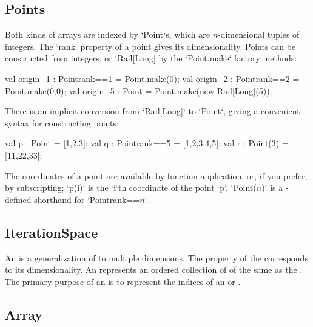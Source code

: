 \subsection{Points}\label{point-syntax}

Both kinds of arrays are indexed by \xcd`Point`s, which are
$n$-dimensional tuples of integers.  The \xcd`rank` property of a
point gives its dimensionality.  Points can be constructed from
integers, or \xcd`Rail[Long] by the \xcd`Point.make` factory methods:
\begin{xten}
val origin_1 : Point{rank==1} = Point.make(0);
val origin_2 : Point{rank==2} = Point.make(0,0);
val origin_5 : Point = Point.make(new Rail[Long](5));
\end{xten}

There is an implicit conversion from \xcd`Rail[Long]` to 
\xcd`Point`, giving
a convenient syntax for constructing points: 

\begin{xten}
val p : Point = [1,2,3];
val q : Point{rank==5} = [1,2,3,4,5];
val r : Point(3) = [11,22,33];
\end{xten}

The coordinates of a point are available by function application, or, if you
prefer, by subscripting; \xcd`p(i)` is the
\xcd`i`th coordinate of the point \xcd`p`. 
\xcdmath`Point($n$)` is a -defined shorthand  for 
\xcdmath`Point{rank==$n$}`.

\subsection{IterationSpace}
An  is a generalization of  to
multiple dimensions.  The  property of the
 corresponds to its dimensionality.  An
 represents an ordered collection of 
of the same  as the .  The primary
purpose of an  is to represent the indices of an
 or .  

\subsection{Array}

